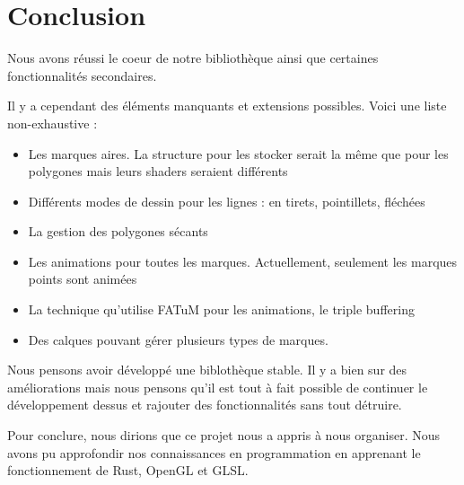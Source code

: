 \documentclass[12pt]{article}
\begin{document}
\section{Conclusion}

Nous avons réussi le coeur de notre bibliothèque ainsi que certaines fonctionnalités
secondaires.

Il y a cependant des éléments manquants et extensions possibles.
Voici une liste non-exhaustive :

\begin{itemize}
\item Les marques aires. La structure pour les stocker serait la même que pour les
polygones mais leurs shaders seraient différents
\item Différents modes de dessin pour les lignes : en tirets, pointillets, fléchées
\item La gestion des polygones sécants
\item Les animations pour toutes les marques. Actuellement, seulement les marques points
sont animées
\item La technique qu'utilise FATuM pour les animations, le triple buffering
\item Des calques pouvant gérer plusieurs types de marques.
\end{itemize}

Nous pensons avoir développé une biblothèque stable. Il y a bien sur des améliorations mais nous pensons
qu'il est tout à fait possible de continuer le développement dessus et rajouter des fonctionnalités sans
tout détruire.

Pour conclure, nous dirions que ce projet nous a appris à nous organiser.
Nous avons pu approfondir nos connaissances en programmation en apprenant le fonctionnement de Rust, OpenGL et
GLSL.

\printglossaries
\printbibliography
\end{document}
